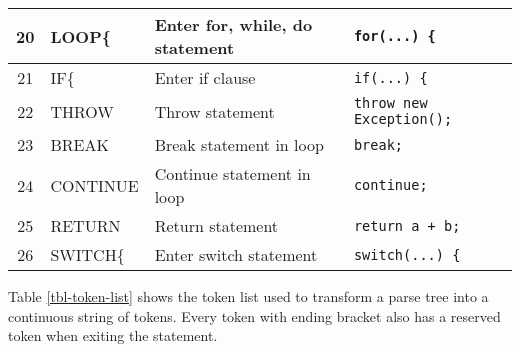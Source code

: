 \begin{table}[ht]
{\begin{tabular}{c l p{7cm} l}
    20 & LOOP\{ & Enter for, while, do statement & \texttt{for(...) \{}\\ \hline
    21 & IF\{ & Enter if clause & \texttt{if(...) \{} \\ \hline
    22 & THROW & Throw statement & \texttt{throw new Exception();} \\ \hline
    23 & BREAK & Break statement in loop & \texttt{break;} \\ \hline
    24 & CONTINUE & Continue statement in loop & \texttt{continue;} \\ \hline
    25 & RETURN & Return statement & \texttt{return a + b;} \\ \hline
    26 & SWITCH\{ & Enter switch statement & \texttt{switch(...) \{} \\ \hline
    \end{tabular}
}
\end{table}

\noindent
Table \ref{tbl-token-list} shows the token list used to transform a parse tree into a continuous string of tokens. Every token with ending bracket also has a reserved token when exiting the statement.